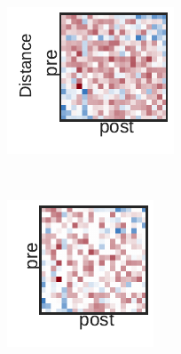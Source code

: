 \begin{figure}[t!]
\begin{subfigure}[b]{1.10in}
  \end{subfigure}
  \\
  \vspace{-.1in}
  \hspace{1em}
  \begin{subfigure}[b]{1.25in}
    \centering
    \includegraphics[width=\textwidth]{figures/ch3/Dense-Distance.pdf}
  \end{subfigure}
  ~
  \hspace{-.1in}
  \begin{subfigure}[b]{1.10in}
    \centering
    \includegraphics[width=\textwidth]{figures/ch3/Bernoulli-Distance.pdf}

\end{subfigure}
\end{figure}
